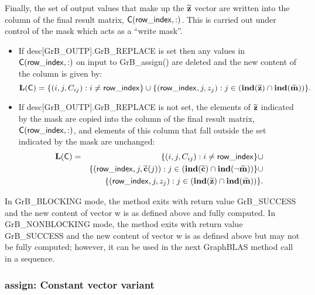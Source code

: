 Finally, the set of output values that make up the ${\bf \widetilde{z}}$ 
vector are written into the column of the final result matrix, 
${\sf C}({\sf row\_index},:)$.  This is carried out under control of the mask 
which acts as a ``write mask''.
\begin{itemize}
    \item If {\sf desc[GrB\_OUTP].GrB\_REPLACE} is set then any values in 
    ${\sf C}({\sf row\_index},:)$ on input to {\sf GrB\_assign()} are deleted 
    and the new content of the column is given by:
    \[ 
		\bold{L}({\sf C}) = \{ (i,j,C_{ij}) : i \neq {\sf row\_index} \} \cup \{({\sf row\_index},j,z_{j}) : j \in 
    (\bold{ind}({\bf \widetilde{z}}) \cap \bold{ind}({\bf \widetilde{m}})) \}. 
    \]

    \item If {\sf desc[GrB\_OUTP].GrB\_REPLACE} is not set, the elements of 
    ${\bf \widetilde{z}}$ indicated by the mask are copied into the column 
    of the final result matrix, ${\sf C}({\sf row\_index},:)$, and elements of 
    this column that fall outside the set indicated by the mask are unchanged:
	\begin{eqnarray} 
		\bold{L}({\sf C}) & = & \{ (i,j,C_{ij}) : i \neq {\sf row\_index} \} \cup \nonumber \\
		& & \{({\sf row\_index},j,{\bf \widetilde{c}}(j)) : j \in (\bold{ind}({\bf \widetilde{c}}) \cap \bold{ind}(\neg {\bf \widetilde{m}})) \} \cup \nonumber \\ 
		& & \{({\sf row\_index},j,z_{j})                     : j \in (\bold{ind}({\bf \widetilde{z}}) \cap \bold{ind}({\bf \widetilde{m}})) \}. \nonumber
	\end{eqnarray}
\end{itemize}

In {\sf GrB\_BLOCKING} mode, the method exits with return value 
{\sf GrB\_SUCCESS} and the new content of vector {\sf w} is as defined above
and fully computed.  
In {\sf GrB\_NONBLOCKING} mode, the method exits with return value 
{\sf GrB\_SUCCESS} and the new content of vector {\sf w} is as defined above 
but may not be fully computed; however, it can be used in the next GraphBLAS 
method call in a sequence.


\subsubsection{{\sf assign}: Constant vector variant}

